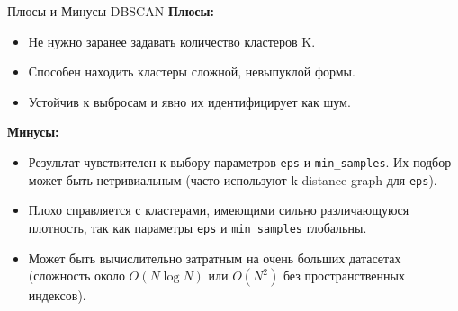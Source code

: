 \begin{alerttextbox}{Плюсы и Минусы DBSCAN}
    \textbf{Плюсы:}
    \begin{itemize}[nosep, leftmargin=*]
        \item Не нужно заранее задавать количество кластеров K.
        \item Способен находить кластеры сложной, невыпуклой формы.
        \item Устойчив к выбросам и явно их идентифицирует как шум.
    \end{itemize}
    \vspace{0.5ex} %
    \textbf{Минусы:}
    \begin{itemize}[nosep, leftmargin=*]
        \item Результат чувствителен к выбору параметров \texttt{eps} и \texttt{min\_samples}. Их подбор может быть нетривиальным (часто используют k-distance graph для \texttt{eps}).
        \item Плохо справляется с кластерами, имеющими сильно различающуюся плотность, так как параметры \texttt{eps} и \texttt{min\_samples} глобальны.
        \item Может быть вычислительно затратным на очень больших датасетах (сложность около $O(N \log N)$ или $O(N^2)$ без пространственных индексов).
    \end{itemize}
\end{alerttextbox}

